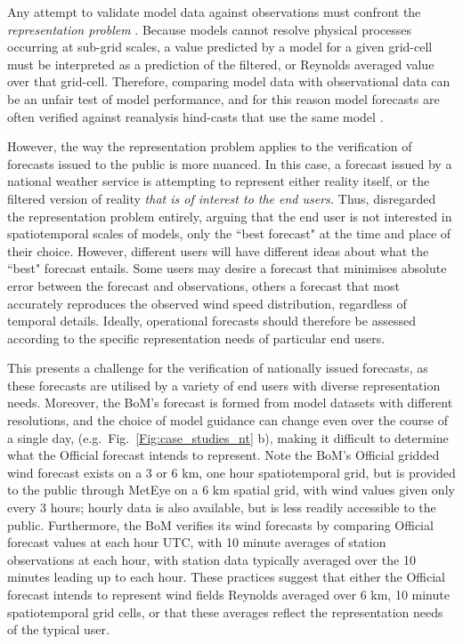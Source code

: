 \documentclass[twocol]{ametsoc}
\begin{document}
Any attempt to validate model data against observations must confront the \textit{representation problem} \citep[e.g.][]{zaron06}. Because models cannot resolve physical processes occurring at sub-grid scales, a value predicted by a model for a given grid-cell must be interpreted as a prediction of the filtered, or Reynolds averaged value over that grid-cell. Therefore, comparing model data with observational data can be an unfair test of model performance, and for this reason model forecasts are often verified against reanalysis hind-casts that use the same model \citep[e.g.][]{lynch14}.

However, the way the representation problem applies to the verification of forecasts issued to the public is more nuanced. In this case, a forecast issued by a national weather service is attempting to represent either reality itself, or the filtered version of reality \textit{that is of interest to the end users.} Thus, \citet{pinson12} disregarded the representation problem entirely, arguing that the end user is not interested in spatiotemporal scales of models, only the ``best forecast" at the time and place of their choice. However, different users will have different ideas about what the ``best" forecast entails. Some users may desire a forecast that minimises absolute error between the forecast and observations, others a forecast that most accurately reproduces the observed wind speed distribution, regardless of temporal details. Ideally, operational forecasts should therefore be assessed according to the specific representation needs of particular end users. 

This presents a challenge for the verification of nationally issued forecasts, as these forecasts are utilised by a variety of end users with diverse representation needs. Moreover, the BoM's forecast is formed from model datasets with different resolutions, and the choice of model guidance can change even over the course of a single day, (e.g.~Fig.~\ref{Fig:case_studies_nt} b), making it difficult to determine what the Official forecast intends to represent. Note the BoM's Official gridded wind forecast exists on a 3 or 6 km, one hour spatiotemporal grid, but is provided to the public through MetEye \citep{bomMetEye19} on a 6 km spatial grid, with wind values given only every 3 hours; hourly data is also available, but is less readily accessible to the public. Furthermore, the BoM verifies its wind forecasts by comparing Official forecast values at each hour UTC, with 10 minute averages of station observations at each hour, with station data typically averaged over the 10 minutes leading up to each hour. These practices suggest that either the Official forecast intends to represent wind fields Reynolds averaged over 6 km, 10 minute spatiotemporal grid cells, or that these averages reflect the representation needs of the typical user. 
\end{document}
